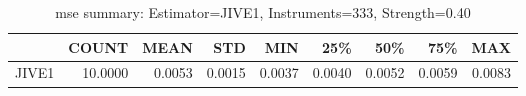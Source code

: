 \begin{table}[ht]
\centering
\caption{mse summary: Estimator=JIVE1, Instruments=333, Strength=0.40}
\begin{tabular}{lrrrrrrrr}
\toprule
 & COUNT & MEAN & STD & MIN & 25\% & 50\% & 75\% & MAX \\
\midrule
JIVE1 & 10.0000 & 0.0053 & 0.0015 & 0.0037 & 0.0040 & 0.0052 & 0.0059 & 0.0083 \\
\bottomrule
\end{tabular}
\end{table}
